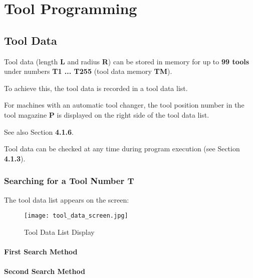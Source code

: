 \chapter{Tool Programming}

\section{Tool Data}

Tool data (length \textbf{L} and radius \textbf{R}) can be stored in memory for up to \textbf{99 tools} under numbers \textbf{T1 ... T255} (tool data memory \textbf{TM}).

To achieve this, the tool data is recorded in a tool data list.

For machines with an automatic tool changer, the tool position number in the tool magazine \textbf{P} is displayed on the right side of the tool data list.

See also Section \textbf{4.1.6}.

Tool data can be checked at any time during program execution (see Section \textbf{4.1.3}).

\subsection{Searching for a Tool Number T}

\begin{itemize}
\end{itemize}

The tool data list appears on the screen:

\begin{figure}[h]
    \centering
    \texttt{[image: tool\_data\_screen.jpg]}
    \caption{Tool Data List Display}
\end{figure}

\newpage

\subsubsection*{First Search Method}

\begin{itemize}
\end{itemize}

\subsubsection*{Second Search Method}

